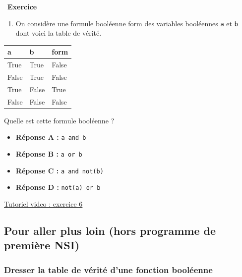 \documentclass[
  11pt,
]{article}
\newcommand{\passthrough}[1]{#1}
\providecommand{\tightlist}{%
  \setlength{\itemsep}{0pt}\setlength{\parskip}{0pt}}
\newcounter{exo}
\newenvironment{exercice}[1]
{\par \medskip   \addtocounter{exo}{1} \noindent  
\begin{bclogo}[arrondi =0.1,   noborder = true, logo=\bccrayon, marge=4]{~\textbf{Exercice} \textbf{\theexo} {\itshape #1} }  \par}
{
\end{bclogo}
 \par \bigskip }
\newcounter{def}
\newcounter{prog}
\begin{document}
\begin{exercice}{}
\begin{enumerate}
\def\labelenumi{\arabic{enumi}.}
\setcounter{enumi}{5}
\tightlist
\item
  On considère une formule booléenne form des variables booléennes
  \passthrough{\lstinline!a!} et \passthrough{\lstinline!b!} dont voici
  la table de vérité.
\end{enumerate}

\begin{longtable}[]{@{}lll@{}}
\toprule
a & b & form\tabularnewline
\midrule
\endhead
True & True & False\tabularnewline
False & True & False\tabularnewline
True & False & True\tabularnewline
False & False & False\tabularnewline
\bottomrule
\end{longtable}

Quelle est cette formule booléenne ?

\begin{itemize}
\tightlist
\item
  \textbf{Réponse A :} \passthrough{\lstinline!a and b!}
\item
  \textbf{Réponse B :} \passthrough{\lstinline!a or b!}
\item
  \textbf{Réponse C :} \passthrough{\lstinline!a and not(b)!}
\item
  \textbf{Réponse D :} \passthrough{\lstinline!not(a) or b!}
\end{itemize}

\href{videos/exercice6.mp4}{Tutoriel video : exercice 6}

\end{exercice}

\hypertarget{pour-aller-plus-loin-hors-programme-de-premiuxe8re-nsi}{%
\subsection{Pour aller plus loin (hors programme de première
NSI)}\label{pour-aller-plus-loin-hors-programme-de-premiuxe8re-nsi}}

\hypertarget{dresser-la-table-de-vuxe9rituxe9-dune-fonction-booluxe9enne}{%
\subsubsection{Dresser la table de vérité d'une fonction
booléenne}\label{dresser-la-table-de-vuxe9rituxe9-dune-fonction-booluxe9enne}}
\end{document}
